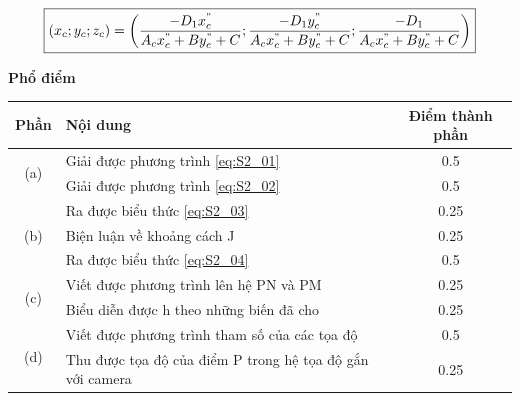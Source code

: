 \begin{enumerate}[label=(\alph*)]
\begin{equation}
\boxed{
\left(x_c;y_c;z_c\right)=\left(\dfrac{-D_1x_c^{"}}{A_cx_c^{"}+By_c^{"}+C} ; \dfrac{-D_1y_c^{"}}{A_cx_c^{"}+By_c^{"}+C} ; \dfrac{-D_1}{A_cx_c^{"}+By_c^{"}+C}\right)
}
\end{equation}


\textbf{Phổ điểm}
    \begin{center}
    \begin{tabular}{|c|p{8cm}|c|}
    \hline
    \multicolumn{1}{|l|}{Phần} & Nội dung & Điểm thành phần \\ 
    \hline
\multirow{2}{*}{(a)} &  Giải được phương trình \eqref{eq:S2_01}                                                                                 & 0.5             \\ \cline{2-3}
                     & Giải được phương trình \eqref{eq:S2_02}
                     & 0.5             \\ \hline
\multirow{3}{*}{(b)} & Ra được biểu thức \eqref{eq:S2_03}                               
                     & 0.25            \\ \cline{2-3}
                     & Biện luận về khoảng cách J                        
                     & 0.25            \\ \cline{2-3}
                     & Ra được biểu thức \eqref{eq:S2_04}               
                     & 0.5             \\ \hline
\multirow{2}{*}{(c)} & Viết được phương trình lên hệ PN và PM                                                       & 0.25            \\ \cline{2-3}
                     & Biểu diễn được h theo những biến đã cho
                     & 0.25     \\ \hline
\multirow{2}{*}{(d)} & Viết được phương trình tham số của các tọa độ
& 0.5          \\ \cline{2-3}
                     &Thu được tọa độ của điểm P trong hệ tọa độ gắn với camera 
                     & 0.25     \\ \hline
    \end{tabular}
    \end{center}
\end{enumerate}